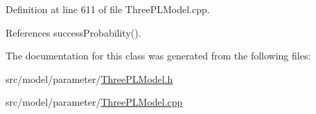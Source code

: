 Definition at line 611 of file Three\+P\+L\+Model.\+cpp.



References success\+Probability().



The documentation for this class was generated from the following files\+:\begin{DoxyCompactItemize}
\item 
src/model/parameter/\hyperlink{ThreePLModel_8h}{Three\+P\+L\+Model.\+h}\item 
src/model/parameter/\hyperlink{ThreePLModel_8cpp}{Three\+P\+L\+Model.\+cpp}\end{DoxyCompactItemize}
